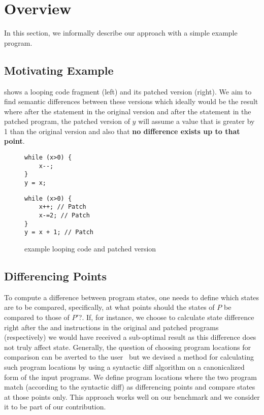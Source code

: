 \section{Overview} 

In this section, we informally describe our approach with a simple example program.

\subsection{Motivating Example}

 shows a looping code fragment (left) and its patched version (right). We aim to find semantic differences between these versions which ideally would be the result where after the  statement in the original version and after the  statement in the patched program, the patched version of $y$ will assume a value that is greater by 1 than the original version and also that \textbf{no difference exists up to that point}.

\begin{figure}[ht]
\begin{minipage}[b]{0.5\linewidth}
\centering
\begin{lstlisting}
while (x>0) {
    x--;
}
y = x;
\end{lstlisting}
\end{minipage}
\hspace{0.5cm}
\begin{minipage}[b]{0.5\linewidth}
\centering
\begin{lstlisting}
while (x>0) {
    x++; // Patch
    x-=2; // Patch
}
y = x + 1; // Patch
\end{lstlisting}
\end{minipage}
\caption{example looping code and patched version}
\end{figure}

\subsection{Differencing Points}
To compute a difference between program states, one needs to define which states are to be compared, specifically, at what points should the states of $P$ be compared to those of $P'$?. If, for instance, we choose to calculate state difference right after the  and  instructions in the original and patched programs (respectively) we would have received a sub-optimal result as this difference does not truly affect state. Generally, the question of choosing program locations for comparison can be averted to the user~\cite{DiffAnalysis} but we devised a method for calculating such program locations by using a syntactic diff algorithm on a canonicalized form of the input programs. We define program locations where the two program match (according to the syntactic diff) as differencing points and compare states at those points only. This approach works well on our benchmark and we consider it to be part of our contribution.

